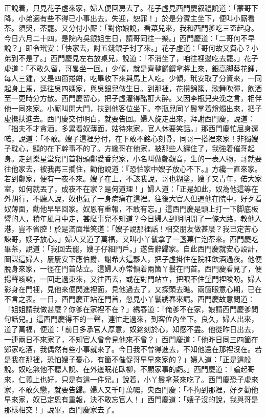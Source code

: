 正說着，只見花子虛來家，婦人便回房去了。花子虛見西門慶叙禮說道：「蒙哥下降，小弟適有些不得已小事出去，失迎，恕罪！」於是分賓主坐下，便叫小厮看茶。須臾，茶罷。又分付小厮：「對你娘說，看菜兒來，我和西門爹吃三盃起身。今日六月二十四，是院內吳銀姐生日，請哥同往一樂。」西門慶道：「二哥何不早說？」即令玳安：「快家去，討五錢銀子封了來。」花子虛道：「哥何故又費心？小弟到不是了。」西門慶見左右放桌兒，說道：「不消坐了，咱往裡邊吃去罷。」花子虛道：「不敢久留，哥畧坐一回。」少傾，就是齊整餚饌拿將上來，銀高脚葵花鍾，每人三鍾，又是四箇捲餅，吃畢收下來與馬上人吃。少傾，玳安取了分資來，一同起身上馬，逕往吳四媽家，與吳銀兒做生日。到那裡，花攢錦簇，歌舞吹彈，飲酒至一更時分方散。西門慶留心，把子虛灌得酩酊大醉。又因李瓶兒央浼之言，相伴他一同來家。小厮叫開大門，扶到他客位坐下。李瓶兒同丫鬟掌着燈燭出來，把子虛攙扶進去。西門慶交付明白，就要告回。婦人旋走出來，拜謝西門慶，說道：「拙夫不才貪酒，多累看奴薄面，{}姑待來家，官人休要笑話。」那西門慶忙屈身還喏，說道：「不敢。嫂子這裡分付，在下敢不銘心刻骨，同哥一搭裡來家！非獨嫂子耽心，顯的在下幹事不的了。方纔哥在他家，被那些人纏住了，我強着催哥起身。走到樂星堂兒門首粉頭鄭愛香兒家，{}小名叫做鄭觀音，生的一表人物，哥就要往他家去，被我再三攔住，勸他說道：『恐怕家中嫂子放心不下。』方纔一直來家。若到鄭家，便有一夜不來。{}嫂子在上，不該我說，哥也糊塗，嫂子又青年，{}偌大家室，如何就丟了，成夜不在家？是何道理！」婦人道：「正是如此，奴為他這等在外胡行，不聽人說，奴也氣了一身病痛在這裡。{}往後大官人但遇他在院中，好歹看奴薄面，勸他早早回家。奴恩有重報，不敢有忘。」{}這西門慶是頭上打一下脚底板響的人，積年風月中走，甚麼事兒不知道？今日婦人到明明開了一條大路，教他入港，豈不省腔！於是滿面堆笑道：「嫂子說那裡話！相交朋友做甚麼？我已定苦心諫哥，嫂子放心。」婦人又道了萬福，又叫小丫鬟拿了一盞菓仁泡茶來。西門慶吃畢茶，說道：「我回去罷，嫂子仔細門戶。」遂告辭歸家。自此西門慶就安心設計，圖謀這婦人，屢屢安下應伯爵、謝希大這夥人，把子虛掛住在院裡飲酒過夜。他便脫身來家，一徑在門首站立。這婦人亦常領着兩箇丫鬟在門首。西門慶看見了，便揚聲咳嗽，一回走過東來，又往西去，{}或在對門站立，把眼不住望門裡睃盼。婦人影身在門裡，見他來便閃進裡面，見他過去了，又探頭去瞧。兩箇眼意心期，已在不言之表。一日，西門慶正站在門首，忽見小丫鬟綉春來請。西門慶故意問道：「姐姐請我做甚麼？你爹在家裡不在？」綉春道：「俺爹不在家，娘請西門慶爹問句話兒。」這西門慶得不的一聲，連忙走過來，到客位內坐下。良久，婦人出來，道了萬福，便道：「前日多承官人厚意，奴銘刻於心，知感不盡。他從昨日出去，一連兩日不來家了，不知官人曾會見他來不曾？」西門慶道：「他昨日同三四箇在鄭家吃酒，我偶然有些小事就來了。今日我不曾得進去，不知他還在那裡沒在。若是我在那裡，恐怕嫂子憂心，有箇不催促哥早早來家的？」婦人道：「正是這般說。奴吃煞他不聽人說、在外邊眠花臥柳，不顧家事的虧。」西門慶道：「論起哥來，仁義上也好，只是有這一件兒。」說着，小丫鬟拿茶來吃了。西門慶恐子虛來家，不敢久戀，就要告歸。婦人又千叮萬囑，央西門慶：「不拘到那裡，好歹勸他早來家，奴已定恩有重報，決不敢忘官人！」{}西門慶道：「嫂子沒的說，我與哥是那樣相交！」說畢，西門慶家去了。

